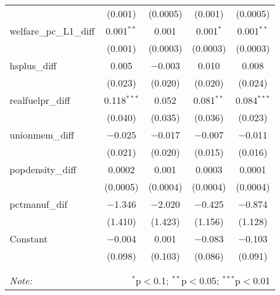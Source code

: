 \begin{table}[!htbp]
\begin{tabular}{@{\extracolsep{5pt}}lcccc}
  & (0.001) & (0.0005) & (0.001) & (0.0005) \\ 
  welfare\_pc\_L1\_diff & 0.001$^{**}$ & 0.001 & 0.001$^{*}$ & 0.001$^{**}$ \\ 
  & (0.001) & (0.0003) & (0.0003) & (0.0003) \\ 
  hsplus\_diff & 0.005 & $-$0.003 & 0.010 & 0.008 \\ 
  & (0.023) & (0.020) & (0.020) & (0.024) \\ 
  realfuelpr\_diff & 0.118$^{***}$ & 0.052 & 0.081$^{**}$ & 0.084$^{***}$ \\ 
  & (0.040) & (0.035) & (0.036) & (0.023) \\ 
  unionmem\_diff & $-$0.025 & $-$0.017 & $-$0.007 & $-$0.011 \\ 
  & (0.021) & (0.020) & (0.015) & (0.016) \\ 
  popdensity\_diff & 0.0002 & 0.001 & 0.0003 & 0.0001 \\ 
  & (0.0005) & (0.0004) & (0.0004) & (0.0004) \\ 
  pctmanuf\_dif & $-$1.346 & $-$2.020 & $-$0.425 & $-$0.874 \\ 
  & (1.410) & (1.423) & (1.156) & (1.128) \\ 
  Constant & $-$0.004 & 0.001 & $-$0.083 & $-$0.103 \\ 
  & (0.098) & (0.103) & (0.086) & (0.091) \\ 
 \hline \\[-1.8ex] 
\hline 
\hline \\[-1.8ex] 
\textit{Note:}  & \multicolumn{4}{r}{$^{*}$p$<$0.1; $^{**}$p$<$0.05; $^{***}$p$<$0.01} \\ 
\end{tabular} 
\end{table} 
